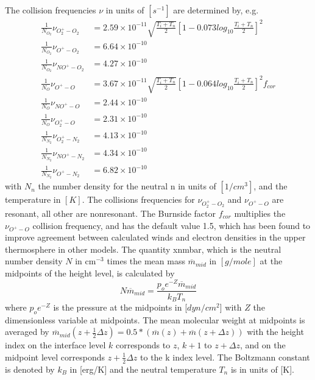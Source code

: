 %
The collision frequencies $\nu$ in units of $[s^{-1}]$ are
determined by, e.g. \cite{Schunk00}
%
\begin{align}
 \frac{1}{N_{O_2}} \nu_{O_2^+ - O_2} &= 2.59\times 10^{-11}\sqrt{\frac{T_i +
 T_n}{2}}\left[ 1-0.073 log_{10}{\frac{T_i +
 T_n}{2}}\right]^2  \\
\frac{1}{N_{O_2}} \nu_{O^+ - O_2}  &=6.64\times 10^{-10}  \\
\frac{1}{N_{O_2}} \nu_{NO^+ - O_2} &=4.27\times 10^{-10}  \\
\frac{1}{N_{O}} \nu_{O^+ - O}      &=3.67\times
10^{-11}\sqrt{\frac{T_i + T_n}{2}}[ 1- 
  0.064 log_{10}{\frac{T_i +T_n}{2}}]^2  f_{cor}  \\
\frac{1}{N_{O}} \nu_{NO^+ - O}    &=2.44\times 10^{-10}  \\
\frac{1}{N_{O}} \nu_{O_2^+ - O}   &=2.31\times 10^{-10}  \\
\frac{1}{N_{N_2}} \nu_{O_2^+ - N_2}&=4.13\times 10^{-10} \\
\frac{1}{N_{N_2}} \nu_{NO^+ - N_2} &=4.34\times 10^{-10} \\
\frac{1}{N_{N_2}} \nu_{O^+ - N_2}  &=6.82\times 10^{-10}
\end{align}
%
with $N_n$ the number density for the neutral n in units of
$[1/cm^3]$, and the temperature in $[K]$. The collisions frequencies
for $\nu_{O_2^+ - O_2}$ and $\nu_{O^+ - O}$ are resonant, all other
are nonresonant. The Burnside factor $f_{cor}$
multiplies the $\nu_{O^+ - O}$ collision frequency, and has the default
value 1.5, which has been found to improve agreement between
calculated winds and electron densities in the upper thermosphere in
other models. The 
quantity xnmbar, which is the neutral number density $N$ in cm$^{-3}$ times the
mean mass $ \overline{m}_{mid} $ in $[g/mole]$ at
the midpoints of the height level, is calculated by
%
\begin{equation}
  N \overline{m}_{mid} = \frac{p_o e^{-Z} \overline{m}_{mid}}{k_B T_n}
\end{equation}
%
where $p_o e^{-Z}$
is the pressure at the midpoints in [$ dyn/cm^2 $] with $Z$ the
dimensionless variable at midpoints. The mean molecular weight at
midpoints is averaged by $\overline{m}_{mid}(z + \frac{1}{2} \Delta
z)= 0.5*(\overline{m}(z)+\overline{m}(z + \Delta z))$ with the
height index on the interface level $k$ corresponds to $z$, $k+1$ to
$z+ \Delta z$, and on the midpoint level corresponds $z +
\frac{1}{2} \Delta z$ to the k index level. The Boltzmann constant
is denoted by $k_B$ in [erg/K] and the neutral temperature
$T_n$ is in units of [K]. \\

